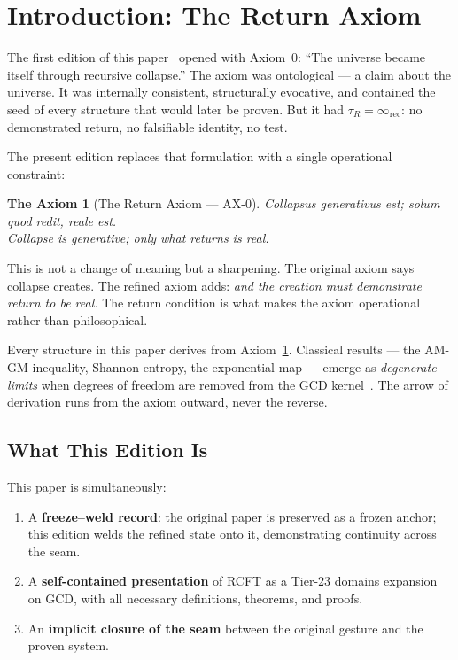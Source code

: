 \documentclass[
  aps,
  prd,
  preprint,
  superscriptaddress,
  nofootinbib,
  floatfix,
  longbibliography
]{revtex4-2}
\newtheorem*{axiom}{The Axiom}
\newcommand{\tR}{\tau_{\!R}}
\newcommand{\lat}[1]{\textit{#1}}
\begin{document}
\maketitle

\section{Introduction: The Return Axiom}\label{sec:intro}

The first edition of this paper~\cite{paulus2025rcft} opened
with Axiom~0: ``The universe became itself through recursive collapse.''
The axiom was ontological — a claim about the universe.
It was internally consistent, structurally evocative, and
contained the seed of every structure that would later be proven.
But it had $\tR = \infty_{\mathrm{rec}}$: no demonstrated return,
no falsifiable identity, no test.

The present edition replaces that formulation with a single
operational constraint:

\begin{axiom}[The Return Axiom — AX-0]\label{ax:0}
\lat{Collapsus generativus est; solum quod redit, reale est.}\\
Collapse is generative; only what returns is real.
\end{axiom}

This is not a change of meaning but a sharpening.
The original axiom says collapse creates.
The refined axiom adds: \emph{and the creation must
demonstrate return to be real.}
The return condition is what makes the axiom operational
rather than philosophical.

Every structure in this paper derives from Axiom~\ref{ax:0}.
Classical results — the AM-GM inequality, Shannon entropy,
the exponential map — emerge as \emph{degenerate limits}
when degrees of freedom are removed from
the GCD kernel~\cite{paulus2025umcp,paulus2025ucd}.
The arrow of derivation runs from the axiom outward,
never the reverse.

\subsection{What This Edition Is}\label{sec:whatthisis}

This paper is simultaneously:
\begin{enumerate}[nosep,leftmargin=*]
  \item A \textbf{freeze–weld record}: the original paper is
    preserved as a frozen anchor; this edition welds the
    refined state onto it, demonstrating continuity across
    the seam.
  \item A \textbf{self-contained presentation} of RCFT as
    a Tier-23 domains expansion on GCD, with all necessary
    definitions, theorems, and proofs.
  \item An \textbf{implicit closure of the seam} between
    the original gesture and the proven system.
\end{enumerate}
\end{document}
